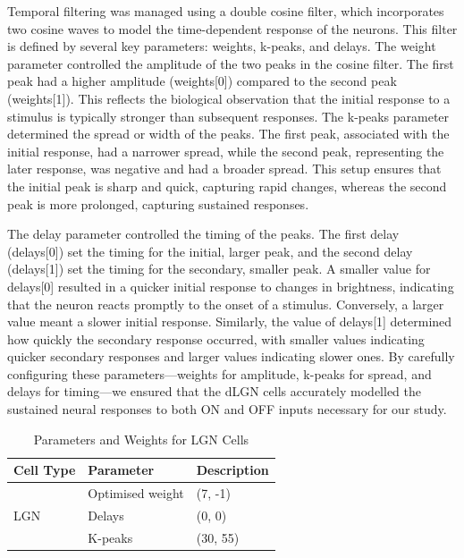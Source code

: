 \documentclass[12pt]{article}
\begin{document}
Temporal filtering was managed using a double cosine filter, which incorporates two cosine waves to model the time-dependent response of the neurons. This filter is defined by several key parameters: weights, k-peaks, and delays. The weight parameter controlled the amplitude of the two peaks in the cosine filter. The first peak had a higher amplitude (weights[0]) compared to the second peak (weights[1]). This reflects the biological observation that the initial response to a stimulus is typically stronger than subsequent responses. The k-peaks parameter determined the spread or width of the peaks. The first peak, associated with the initial response, had a narrower spread, while the second peak, representing the later response, was negative and had a broader spread. This setup ensures that the initial peak is sharp and quick, capturing rapid changes, whereas the second peak is more prolonged, capturing sustained responses.

The delay parameter controlled the timing of the peaks. The first delay (delays[0]) set the timing for the initial, larger peak, and the second delay (delays[1]) set the timing for the secondary, smaller peak. A smaller value for delays[0] resulted in a quicker initial response to changes in brightness, indicating that the neuron reacts promptly to the onset of a stimulus. Conversely, a larger value meant a slower initial response. Similarly, the value of delays[1] determined how quickly the secondary response occurred, with smaller values indicating quicker secondary responses and larger values indicating slower ones. By carefully configuring these parameters—weights for amplitude, k-peaks for spread, and delays for timing—we ensured that the dLGN cells accurately modelled the sustained neural responses to both ON and OFF inputs necessary for our study.

\begin{table}[H]
  \centering
  \caption{Parameters and Weights for LGN Cells}
  \begin{tabular}{lll}
  \toprule
  \textbf{Cell Type} & \textbf{Parameter} & \textbf{Description} \\
  \midrule
  \multirow{4}{*}{LGN} 
      & Optimised weight      & (7, -1) \\
      & Delays   & (0, 0) \\
      & K-peaks   & (30, 55) \\
  \bottomrule
  \end{tabular}
\end{table}
\end{document}
